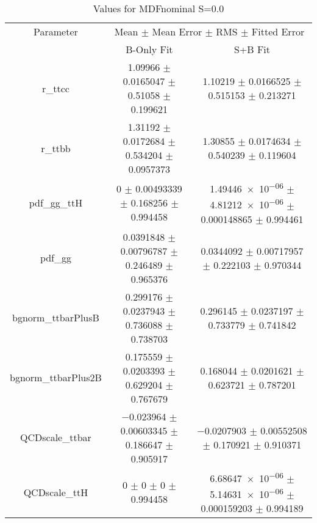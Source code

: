 \begin{table}
\centering
\caption{Values for MDFnominal S=0.0}
\begin{tabular}{ccc}
\toprule
Parameter & \multicolumn{2}{c}{Mean $\pm$ Mean Error $\pm$ RMS $\pm$ Fitted Error}\\
 & B-Only Fit & S+B Fit\\
\midrule
r\_ttcc & \num{1.09966} $\pm$ \num{0.0165047} $\pm$ \num{0.51058} $\pm$ \num{0.199621} & \num{1.10219} $\pm$ \num{0.0166525} $\pm$ \num{0.515153} $\pm$ \num{0.213271}\\
r\_ttbb & \num{1.31192} $\pm$ \num{0.0172684} $\pm$ \num{0.534204} $\pm$ \num{0.0957373} & \num{1.30855} $\pm$ \num{0.0174634} $\pm$ \num{0.540239} $\pm$ \num{0.119604}\\
pdf\_gg\_ttH & \num{0} $\pm$ \num{0.00493339} $\pm$ \num{0.168256} $\pm$ \num{0.994458} & \num{1.49446e-06} $\pm$ \num{4.81212e-06} $\pm$ \num{0.000148865} $\pm$ \num{0.994461}\\
pdf\_gg & \num{0.0391848} $\pm$ \num{0.00796787} $\pm$ \num{0.246489} $\pm$ \num{0.965376} & \num{0.0344092} $\pm$ \num{0.00717957} $\pm$ \num{0.222103} $\pm$ \num{0.970344}\\
bgnorm\_ttbarPlusB & \num{0.299176} $\pm$ \num{0.0237943} $\pm$ \num{0.736088} $\pm$ \num{0.738703} & \num{0.296145} $\pm$ \num{0.0237197} $\pm$ \num{0.733779} $\pm$ \num{0.741842}\\
bgnorm\_ttbarPlus2B & \num{0.175559} $\pm$ \num{0.0203393} $\pm$ \num{0.629204} $\pm$ \num{0.767679} & \num{0.168044} $\pm$ \num{0.0201621} $\pm$ \num{0.623721} $\pm$ \num{0.787201}\\
QCDscale\_ttbar & \num{-0.023964} $\pm$ \num{0.00603345} $\pm$ \num{0.186647} $\pm$ \num{0.905917} & \num{-0.0207903} $\pm$ \num{0.00552508} $\pm$ \num{0.170921} $\pm$ \num{0.910371}\\
QCDscale\_ttH & \num{0} $\pm$ \num{0} $\pm$ \num{0} $\pm$ \num{0.994458} & \num{6.68647e-06} $\pm$ \num{5.14631e-06} $\pm$ \num{0.000159203} $\pm$ \num{0.994189}\\
\bottomrule
\end{tabular}
\end{table}